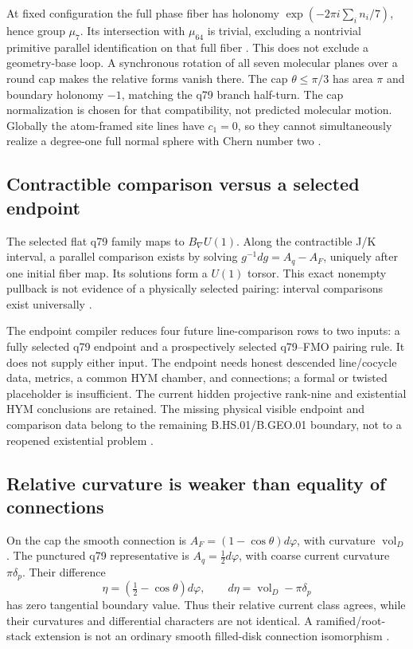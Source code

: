\documentclass[11pt]{article}
\theoremstyle{definition}
\theoremstyle{remark}
\begin{document}
At fixed configuration the full phase fiber has holonomy
\(\exp(-2\pi i\sum_i n_i/7)\), hence group \(\mu_7\). Its intersection
with \(\mu_{64}\) is trivial, excluding a nontrivial primitive parallel
identification on that full fiber \cite{beq35}. This does not exclude a
geometry-base loop. A synchronous rotation of all seven molecular planes
over a round cap makes the relative forms vanish there. The cap
\(\theta\leq\pi/3\) has area \(\pi\) and boundary holonomy \(-1\), matching
the q79 branch half-turn. The cap normalization is chosen for that
compatibility, not predicted molecular motion. Globally the atom-framed
site lines have \(c_1=0\), so they cannot simultaneously realize a
degree-one full normal sphere with Chern number two \cite{beq42}.

\subsection{Contractible comparison versus a selected endpoint}
\label{sec:interval-descent}
The selected flat q79 family maps to \(B_\nabla U(1)\). Along the
contractible J/K interval, a parallel comparison exists by solving
\(g^{-1}dg=A_q-A_F\), uniquely after one initial fiber map. Its solutions
form a \(U(1)\) torsor. This exact nonempty pullback is not evidence
of a physically selected pairing: interval comparisons exist universally
\cite{beq44}.

The endpoint compiler reduces four future line-comparison rows to two
inputs: a fully selected q79 endpoint and a prospectively selected
q79--FMO pairing rule. It does not supply either input. The endpoint needs
honest descended line/cocycle data, metrics, a common HYM chamber, and
connections; a formal or twisted placeholder is insufficient. The current
hidden projective rank-nine and existential HYM conclusions are retained.
The missing physical visible endpoint and comparison data belong to the
remaining B.HS.01/B.GEO.01 boundary, not to a reopened existential problem
\cite{beq45}.

\subsection{Relative curvature is weaker than equality of connections}
\label{sec:relative-repair}
On the cap the smooth connection is \(A_F=(1-\cos\theta)d\varphi\),
with curvature \(\operatorname{vol}_D\). The punctured q79 representative
is \(A_q=\tfrac12d\varphi\), with coarse current curvature
\(\pi\delta_p\). Their difference
\[
\eta=(\tfrac12-\cos\theta)d\varphi,\qquad
d\eta=\operatorname{vol}_D-\pi\delta_p
\]
has zero tangential boundary value. Thus their relative current class
agrees, while their curvatures and differential characters are not identical.
A ramified/root-stack extension is not an ordinary smooth filled-disk
connection isomorphism \cite{beq38,beq42}.
\end{document}
